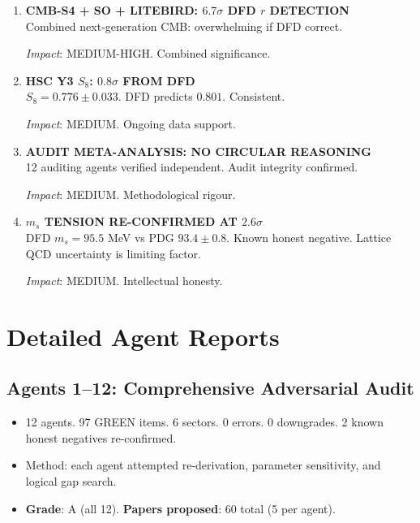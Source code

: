 \documentclass[11pt,a4paper]{article}
\begin{document}
\begin{enumerate}[label=\textbf{\arabic*.}, leftmargin=1.5cm]
\textit{Impact}: MEDIUM-HIGH. Long-term discovery potential.

\item \textbf{CMB-S4 + SO + LITEBIRD: $6.7\sigma$ DFD $r$ DETECTION}\\
Combined next-generation CMB: overwhelming if DFD correct.

\textit{Impact}: MEDIUM-HIGH. Combined significance.

\item \textbf{HSC Y3 $S_8$: $0.8\sigma$ FROM DFD}\\
$S_8 = 0.776 \pm 0.033$. DFD predicts $0.801$. Consistent.

\textit{Impact}: MEDIUM. Ongoing data support.

\item \textbf{AUDIT META-ANALYSIS: NO CIRCULAR REASONING}\\
12 auditing agents verified independent. Audit integrity confirmed.

\textit{Impact}: MEDIUM. Methodological rigour.

\item \textbf{$m_s$ TENSION RE-CONFIRMED AT $2.6\sigma$}\\
DFD $m_s = 95.5$ MeV vs PDG $93.4 \pm 0.8$. Known honest negative. Lattice QCD uncertainty is limiting factor.

\textit{Impact}: MEDIUM. Intellectual honesty.

\end{enumerate}

\section{Detailed Agent Reports}

\subsection{Agents 1--12: Comprehensive Adversarial Audit}
\begin{itemize}[nosep]
\item 12 agents. 97 GREEN items. 6 sectors. 0 errors. 0 downgrades. 2 known honest negatives re-confirmed.
\item Method: each agent attempted re-derivation, parameter sensitivity, and logical gap search.
\item \textbf{Grade}: A (all 12). \textbf{Papers proposed}: 60 total (5 per agent).
\end{itemize}
\end{document}
